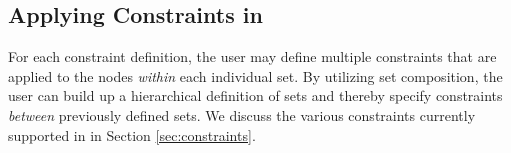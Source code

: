 \subsection{Applying Constraints in \projectname}

For each constraint definition, the user may define multiple constraints
that are applied to the nodes \emph{within} each individual set. 
By utilizing set composition, the user can build up a hierarchical 
definition of sets and thereby specify constraints \emph{between} 
previously defined sets. We discuss the various constraints currently 
supported in \projectname in Section \ref{sec:constraints}.
